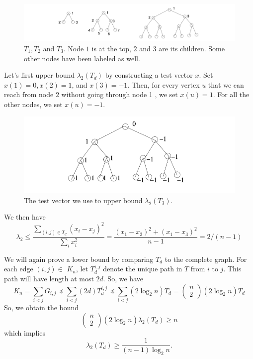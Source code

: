 \documentclass{article}
\begin{document}
\begin{figure}[ht]
 \centering
 \includegraphics[width=1\linewidth]{Figs/tree.png}
\centering
\caption{$T_{1}, T_{2}$ and $T_{3}$. Node $1$ is at the top, $2$ and $3$ are its children. Some other nodes have been labeled as well.}
		\label{be:tree}
\end{figure}


Let's first upper bound $\lambda_{2}\left(T_{d}\right)$ by constructing a test vector $x .$ Set $x(1)=0, x(2)=1$, and $x(3)=-1$. Then, for every vertex $u$ that we can reach from node 2 without going through node 1 , we set $x(u)=1$. For all the other nodes, we set $x(u)=-1$.

\begin{figure}[ht]
 \centering
 \includegraphics[width=0.5\linewidth]{Figs/tree_test.png}
\centering
\caption{The test vector we use to upper bound $\lambda_{2}\left(T_{3}\right)$.}
		\label{be:treetest}
\end{figure}

We then have
$$
\lambda_{2} \leq \frac{\sum_{(i, j) \in T_{d}}\left(x_{i}-x_{j}\right)^{2}}{\sum_{i} x_{i}^{2}}=\frac{\left(x_{1}-x_{2}\right)^{2}+\left(x_{1}-x_{3}\right)^{2}}{n-1}=2 /(n-1)
$$


We will again prove a lower bound by comparing $T_{d}$ to the complete graph. For each edge $(i, j) \in$ $K_{n}$, let $T_{d}^{i, j}$ denote the unique path in $T$ from $i$ to $j$. This path will have length at most $2 d$. So, we have
$$
K_{n}=\sum_{i<j} G_{i, j} \preccurlyeq \sum_{i<j}(2 d) T_{d}^{i, j} \preccurlyeq \sum_{i<j}\left(2 \log _{2} n\right) T_{d}=\left(\begin{array}{c}
n \\
2
\end{array}\right)\left(2 \log _{2} n\right) T_{d}
$$
So, we obtain the bound
$$
\left(\begin{array}{l}
n \\
2
\end{array}\right)\left(2 \log _{2} n\right) \lambda_{2}\left(T_{d}\right) \geq n
$$
which implies
$$
\lambda_{2}\left(T_{d}\right) \geq \frac{1}{(n-1) \log _{2} n} .
$$
\end{document}
